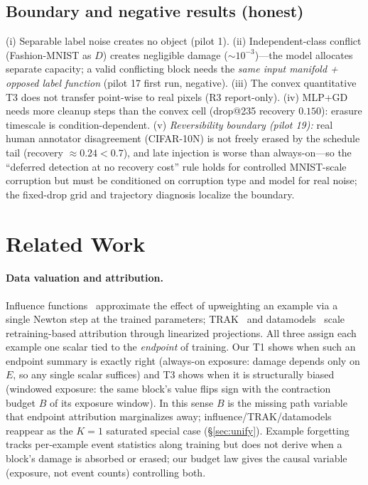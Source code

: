 \documentclass{article}
\newcommand{\Expo}{E}         %
\newcommand{\B}{B}            %
\begin{document}
\subsection{Boundary and negative results (honest)}
(i) Separable label noise creates no object (pilot 1). (ii) Independent-class conflict
(Fashion-MNIST as $D$) creates negligible damage ($\sim10^{-3}$)---the model allocates separate
capacity; a valid conflicting block needs the \emph{same input manifold + opposed label function}
(pilot 17 first run, negative). (iii) The convex quantitative T3 does not transfer point-wise to
real pixels (R3 report-only). (iv) MLP+GD needs more cleanup steps than the convex cell
(drop@235 recovery $0.150$): erasure timescale is condition-dependent. (v) \emph{Reversibility
boundary (pilot 19):} real human annotator disagreement (CIFAR-10N) is not freely erased by the
schedule tail (recovery $\approx0.24<0.7$), and late injection is worse than always-on---so the
``deferred detection at no recovery cost'' rule holds for controlled MNIST-scale corruption but
must be conditioned on corruption type and model for real noise; the fixed-drop grid and
trajectory diagnosis localize the boundary.

\section{Related Work}
\label{sec:related}

\paragraph{Data valuation and attribution.} Influence
functions~\citep{koh2017understanding} approximate the effect of upweighting an example via a
single Newton step at the trained parameters; TRAK~\citep{park2023trak} and
datamodels~\citep{ilyas2022datamodels} scale retraining-based attribution through linearized
projections. All three assign each example one scalar tied to the \emph{endpoint} of training.
Our T1 shows when such an endpoint summary is exactly right (always-on exposure: damage depends
only on $\Expo$, so any single scalar suffices) and T3 shows when it is structurally biased
(windowed exposure: the same block's value flips sign with the contraction budget $\B$ of its
exposure window). In this sense $\B$ is the missing path variable that endpoint
attribution marginalizes away; influence/TRAK/datamodels reappear as the $K{=}1$ saturated
special case (\S\ref{sec:unify}). Example forgetting~\citep{toneva2019forgetting} tracks
per-example event statistics along training but does not derive when a block's damage is
absorbed or erased; our budget law gives the causal variable (exposure, not event counts)
controlling both.
\end{document}
